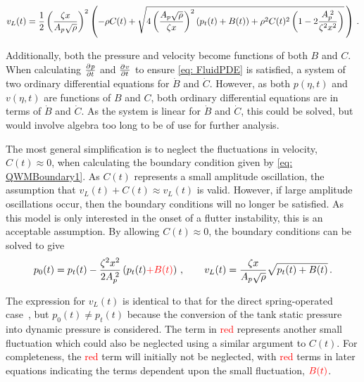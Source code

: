 \begin{equation*}
    v_L(t) = \frac{1}{2} \left( \frac{\zeta x}{A_p \sqrt{\rho}} \right)^2 \left( - \rho C(t) + \sqrt{4 \left( \frac{A_p \sqrt{\rho}}{\zeta x} \right)^2 \left( p_t(t) + B(t) \right) + \rho^2 C(t)^2 \left( 1 - 2 \frac{A_p^{\;2}}{\zeta^2 x^2} \right)} \, \right) \, .
\end{equation*}



Additionally, both the pressure and velocity become functions of both $B$ and $C$. When calculating $\pdiff{p}{t}$ and $\pdiff{v}{t}$ to ensure \cref{eq: FluidPDE} is satisfied, a system of two ordinary differential equations for $\dot{B}$ and $\dot{C}$. However, as both $p(\eta,t)$ and $v(\eta,t)$ are functions of $B$ and $C$, both ordinary differential equations are in terms of $\dot{B}$ and $\dot{C}$. As the system is linear for $\dot{B}$ and $\dot{C}$, this could be solved, but would involve algebra too long to be of use for further analysis.

The most general simplification is to neglect the fluctuations in velocity, $C(t) \approx 0$, when calculating the boundary condition given by \cref{eq: QWMBoundary1}. As $C(t)$ represents a small amplitude oscillation, the assumption that $v_L(t) + C(t) \approx v_L(t)$ is valid. However, if large amplitude oscillations occur, then the boundary conditions will no longer be satisfied. As this model is only interested in the onset of a flutter instability, this is an acceptable assumption. By allowing $C(t) \approx 0$, the boundary conditions can be solved to give
~
\begin{equation} \label{eq: QWMPresAndVelBound}
    p_0(t) = p_t(t) - \frac{\zeta^2 x^2}{2 A_p\power{2}} \left( p_t(t) \textcolor{Red}{+ B(t)} \right)
    \, , \qquad
    v_L(t) = \frac{\zeta x}{A_p \sqrt{\rho}} \sqrt{p_t(t) + B(t)} \, .
\end{equation}

The expression for $v_L(t)$ is identical to that for the direct spring-operated case~\cite{Hos2015ModelPipe}, but $p_0(t) \neq p_t(t)$ because the conversion of the tank static pressure into dynamic pressure is considered. The term in \textcolor{Red}{red} represents another small fluctuation which could also be neglected using a similar argument to $C(t)$. For completeness, the \textcolor{Red}{red} term will initially not be neglected, with \textcolor{Red}{red} terms in later equations indicating the terms dependent upon the small fluctuation, $\textcolor{Red}{B(t)}$.

